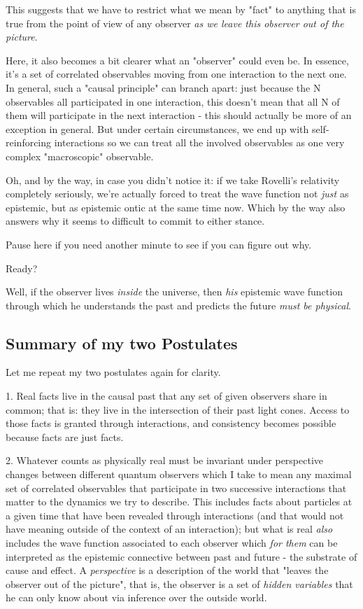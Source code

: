 \documentclass{article}
\begin{document}
This suggests that we have to restrict what we mean by "fact" to anything that is true from the point of view of any observer \textit{as we leave this observer out of the picture}.

Here, it also becomes a bit clearer what an "observer" could even be. In essence, it's a set of correlated observables moving from one interaction to the next one. In general, such a "causal principle" can branch apart: just because the N observables all participated in one interaction, this doesn't mean that all N of them will participate in the next interaction - this should actually be more of an exception in general. But under certain circumstances, we end up with self-reinforcing interactions so we can treat all the involved observables as one very complex "macroscopic" observable.

Oh, and by the way, in case you didn't notice it: if we take Rovelli's relativity completely seriously, we're actually forced to treat the wave function not \textit{just} as epistemic, but as  epistemic  ontic at the same time now. Which by the way also answers why it seems to difficult to commit to either stance.

Pause here if you need another minute to see if you can figure out why.

Ready?

Well, if the observer lives \textit{inside} the universe, then \textit{his} epistemic wave function through which he understands the past and predicts the future \textit{must be physical}.

\subsection{Summary of my two Postulates}

Let me repeat my two postulates again for clarity.

1. Real facts live in the causal past that any set of given observers share in common; that is: they live in the intersection of their past light cones. Access to those facts is granted through interactions, and consistency becomes possible because facts are just facts.

2. Whatever counts as physically real must be invariant under perspective changes between different quantum observers which I take to mean any maximal set of correlated observables that participate in two successive interactions that matter to the dynamics we try to describe. This includes facts about particles at a given time that have been revealed through interactions (and that would not have meaning outside of the context of an interaction); but what is real \textit{also} includes the wave function associated to each observer which \textit{for them} can be interpreted as the epistemic connective between past and future - the substrate of cause and effect. A \textit{perspective} is a description of the world that "leaves the observer out of the picture", that is, the observer is a set of \textit{hidden variables} that he can only know about via inference over the outside world.
\end{document}
